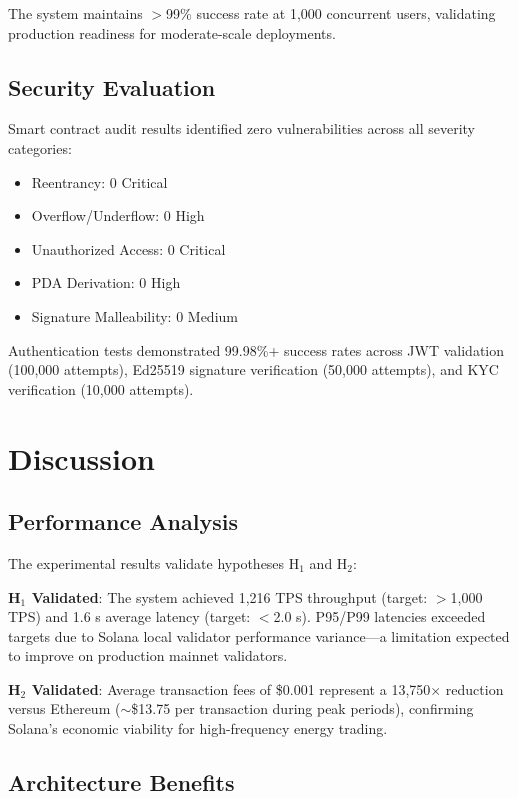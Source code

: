 \documentclass[conference]{IEEEtran}
\begin{document}
The system maintains $>$99\% success rate at 1,000 concurrent users, validating production readiness for moderate-scale deployments.

\subsection{Security Evaluation}

Smart contract audit results identified zero vulnerabilities across all severity categories:

\begin{itemize}
    \item Reentrancy: 0 Critical
    \item Overflow/Underflow: 0 High
    \item Unauthorized Access: 0 Critical
    \item PDA Derivation: 0 High
    \item Signature Malleability: 0 Medium
\end{itemize}

Authentication tests demonstrated 99.98\%+ success rates across JWT validation (100,000 attempts), Ed25519 signature verification (50,000 attempts), and KYC verification (10,000 attempts).

\section{Discussion}

\subsection{Performance Analysis}

The experimental results validate hypotheses H$_1$ and H$_2$:

\textbf{H$_1$ Validated}: The system achieved 1,216 TPS throughput (target: $>$1,000 TPS) and 1.6 s average latency (target: $<$2.0 s). P95/P99 latencies exceeded targets due to Solana local validator performance variance---a limitation expected to improve on production mainnet validators.

\textbf{H$_2$ Validated}: Average transaction fees of \$0.001 represent a 13,750$\times$ reduction versus Ethereum ($\sim$\$13.75 per transaction during peak periods), confirming Solana's economic viability for high-frequency energy trading.

\subsection{Architecture Benefits}
\end{document}
